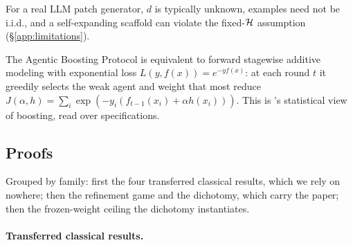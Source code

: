 For a real LLM patch generator, $d$ is typically unknown, examples need not be i.i.d., and a self-expanding scaffold can violate the fixed-$\mathcal{H}$ assumption (\S\ref{app:limitations}).

\begin{theorem}
\label{thm:fsam}
The Agentic Boosting Protocol is equivalent to forward stagewise additive modeling with exponential loss $L(y,f(x))=e^{-yf(x)}$: at each round $t$ it greedily selects the weak agent and weight that most reduce $J(\alpha,h)=\sum_i\exp(-y_i(f_{t-1}(x_i)+\alpha h(x_i)))$. This is \citet{friedman2000additive}'s statistical view of boosting, read over specifications.
\end{theorem}

\subsection{Proofs}
\label{app:proof-bodies}

Grouped by family: first the four transferred classical results, which we rely on nowhere; then the refinement game and the dichotomy, which carry the paper; then the frozen-weight ceiling the dichotomy instantiates.

\paragraph{Transferred classical results.}

